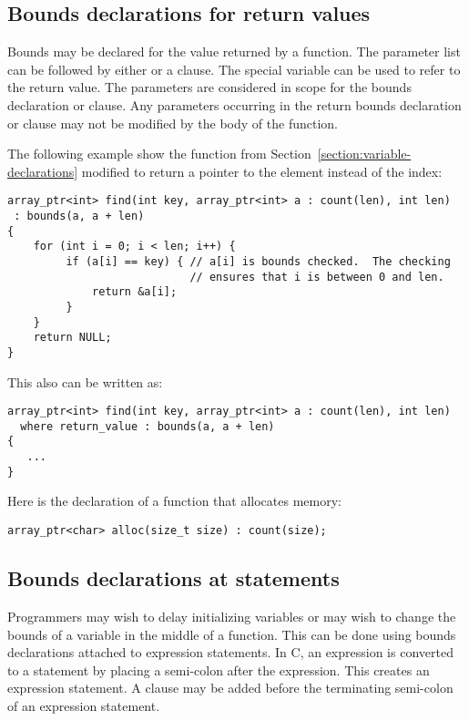 \subsection{Bounds declarations for return values}

Bounds may be declared for the value returned by a function. The
parameter list can be followed by either \code{:}  or
a  clause. The special variable  can
be used to refer to the return value. The parameters are considered in
scope for the bounds declaration or  clause. Any parameters
occurring in the return bounds declaration or  clause may
not be modified by the body of the function.

The following example show the  function from
Section~\ref{section:variable-declarations} modified
to return a pointer to the element instead of the index:

\begin{lstlisting}
array_ptr<int> find(int key, array_ptr<int> a : count(len), int len)
 : bounds(a, a + len)
{
    for (int i = 0; i < len; i++) {
         if (a[i] == key) { // a[i] is bounds checked.  The checking
                            // ensures that i is between 0 and len.
             return &a[i];
         }
    }
    return NULL;
}
\end{lstlisting}

This also can be written as:

\begin{lstlisting}
array_ptr<int> find(int key, array_ptr<int> a : count(len), int len)
  where return_value : bounds(a, a + len)
{
   ...
}
\end{lstlisting}
Here is the declaration of a function that allocates memory:

\begin{lstlisting}
array_ptr<char> alloc(size_t size) : count(size);
\end{lstlisting}



\subsection{Bounds declarations at statements}
\label{section:statement-declarations}

Programmers may wish to delay initializing variables or may wish to
change the bounds of a variable in the middle of a function. This can be
done using bounds declarations attached to expression statements. In C,
an expression is converted to a statement by placing a semi-colon after
the expression. This creates an expression statement. A 
clause may be added before the terminating semi-colon of an expression
statement.

